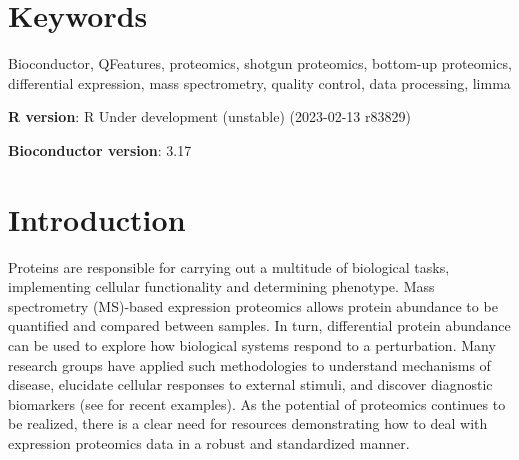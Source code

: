 \documentclass[9pt,a4paper,]{extarticle}
\begin{document}
\section*{Keywords}
Bioconductor, QFeatures, proteomics, shotgun proteomics, bottom-up proteomics,
differential expression, mass spectrometry, quality control, data processing,
limma


\clearpage
\pagestyle{main}

\textbf{R version}: R Under development (unstable) (2023-02-13 r83829)

\textbf{Bioconductor version}: 3.17

\hypertarget{introduction}{%
\section{Introduction}\label{introduction}}

Proteins are responsible for carrying out a multitude of biological tasks,
implementing cellular functionality and determining phenotype. Mass spectrometry
(MS)-based expression proteomics allows protein abundance to be quantified and
compared between samples. In turn, differential protein abundance can be used to
explore how biological systems respond to a perturbation. Many research groups
have applied such methodologies to understand mechanisms of disease, elucidate
cellular responses to external stimuli, and discover diagnostic biomarkers (see
\citep{PinaJimnez2021, AmiriDashatan2021, Anitua2018} for recent examples). As the
potential of proteomics continues to be realized, there is a clear need for
resources demonstrating how to deal with expression proteomics data in a robust
and standardized manner.
\end{document}
